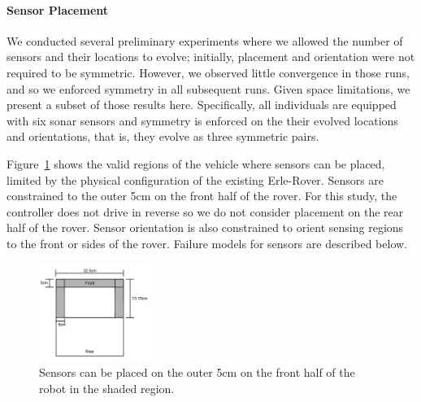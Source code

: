 \paragraph{Sensor Placement}
We conducted several preliminary experiments where we allowed the number of sensors and their 
locations to evolve; initially, placement and orientation were not required to be symmetric.
However, we observed little convergence in those runs, and so we enforced symmetry
in all subsequent runs.
Given space limitations, we present a subset of those results here.  
Specifically, all individuals are equipped with
six sonar sensors and symmetry is enforced on the 
their evolved locations and orientations, that is, they evolve as three symmetric pairs.

Figure~\ref{ga_search_space_fig} shows the valid regions of the vehicle where 
sensors can be placed, limited by the 
%
physical configuration of the existing Erle-Rover.
%
Sensors are constrained to the outer 5cm on the front half of the rover.  
%
For this study, the controller does not drive in reverse so we do not consider placement on the rear half of the rover.  
%
Sensor orientation is also constrained to orient sensing regions to the front or sides of the rover.  
Failure models for sensors are described below.
\vspace{-0.1in}
\begin{figure}[ht]
	\centering
    \includegraphics[width=0.32\textwidth]{Figures/sensor_placement_shaded.png}
    \vspace{-0.2in}
    \caption{Sensors can be placed on the outer 5cm on the front half of the robot in the shaded region.}
    \label{ga_search_space_fig}
    \vspace{-0.1in}
\end{figure}

